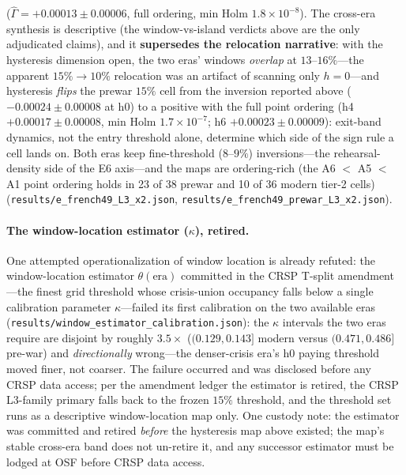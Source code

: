 \documentclass{article}
\begin{document}
($\hat\Gamma = +0.00013 \pm 0.00006$, full ordering, min Holm
$1.8\times10^{-8}$). The cross-era synthesis is descriptive (the
window-vs-island verdicts above are the only adjudicated claims),
and it \textbf{supersedes the relocation narrative}: with the
hysteresis dimension open, the two eras' windows \emph{overlap} at
$13$--$16\%$---the apparent $15\% \to 10\%$ relocation was an
artifact of scanning only $h{=}0$---and hysteresis \emph{flips} the
prewar $15\%$ cell from the inversion reported above
($-0.00024 \pm 0.00008$ at h0) to a positive with the full point
ordering (h4 $+0.00017 \pm 0.00008$, min Holm $1.7\times10^{-7}$;
h6 $+0.00023 \pm 0.00009$): exit-band dynamics, not the entry
threshold alone, determine which side of the sign rule a cell lands
on. Both eras keep fine-threshold ($8$--$9\%$) inversions---the
rehearsal-density side of the E6 axis---and the maps are
ordering-rich (the A6 $<$ A5 $<$ A1 point ordering holds in 23 of 38
prewar and 10 of 36 modern tier-2 cells)
(\texttt{results/e\_french49\_L3\_x2.json},
\texttt{results/e\_french49\_prewar\_L3\_x2.json}).

\paragraph{The window-location estimator ($\kappa$), retired.} One
attempted operationalization of window location is already refuted:
the window-location estimator $\theta(\mathrm{era})$ committed in the
CRSP T-split amendment---the finest grid threshold whose
crisis-union occupancy falls below a single calibration parameter
$\kappa$---failed its first calibration on the two available eras
(\texttt{results/window\_estimator\_calibration.json}): the $\kappa$
intervals the two eras require are disjoint by roughly
$3.5{\times}$ ($(0.129, 0.143]$ modern versus $(0.471, 0.486]$
pre-war) and \emph{directionally} wrong---the denser-crisis era's
h0 paying threshold moved finer, not coarser. The failure occurred
and was
disclosed before any CRSP data access; per the amendment ledger the
estimator is retired, the CRSP L3-family primary falls back to the
frozen $15\%$ threshold, and the threshold set runs as a descriptive
window-location map only. One custody note: the estimator was
committed and retired \emph{before} the hysteresis map above
existed; the map's stable cross-era band does not un-retire it, and
any successor estimator must be lodged at OSF before CRSP data
access.
\end{document}
